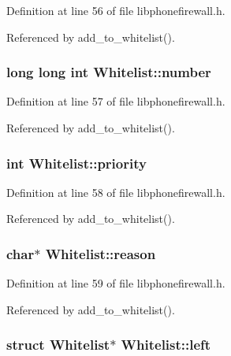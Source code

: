 Definition at line 56 of file libphonefirewall.h.

Referenced by add\_\-to\_\-whitelist().\hypertarget{structWhitelist_b6be6094565f6cafd60edf5573ade306}{
\subsubsection{\setlength{\rightskip}{0pt plus 5cm}long long int {\bf Whitelist::number}}}
\label{structWhitelist_b6be6094565f6cafd60edf5573ade306}




Definition at line 57 of file libphonefirewall.h.

Referenced by add\_\-to\_\-whitelist().\hypertarget{structWhitelist_a88dab00804dbe50d9255e0fa75d1438}{
\subsubsection{\setlength{\rightskip}{0pt plus 5cm}int {\bf Whitelist::priority}}}
\label{structWhitelist_a88dab00804dbe50d9255e0fa75d1438}




Definition at line 58 of file libphonefirewall.h.

Referenced by add\_\-to\_\-whitelist().\hypertarget{structWhitelist_22d667946147519356f386dee8a05a17}{
\subsubsection{\setlength{\rightskip}{0pt plus 5cm}char$\ast$ {\bf Whitelist::reason}}}
\label{structWhitelist_22d667946147519356f386dee8a05a17}




Definition at line 59 of file libphonefirewall.h.

Referenced by add\_\-to\_\-whitelist().\hypertarget{structWhitelist_954a1d648ca2342328577e06b98385ba}{
\subsubsection{\setlength{\rightskip}{0pt plus 5cm}struct {\bf Whitelist}$\ast$ {\bf Whitelist::left}}}
\label{structWhitelist_954a1d648ca2342328577e06b98385ba}




